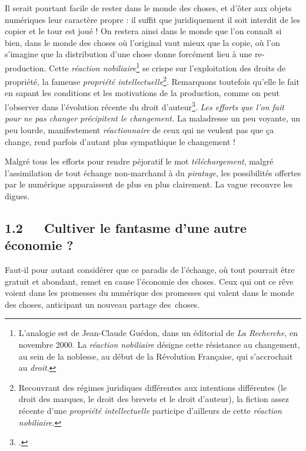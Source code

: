 \documentclass{FramateX}
\begin{document}
\begin{refsection}
Il serait pourtant facile de rester dans le monde des choses, et d'ôter
aux objets numériques leur caractère propre : il suffit que
juridiquement il soit interdit de les copier et le tour est joué ! On
restera ainsi dans le monde que l'on connaît si bien, dans le monde des
choses où l'original vaut mieux que la copie, où l'on s'imagine que la
distribution d'une chose donne forcément lieu à une re-production.
Cette \textit{réaction nobiliaire}\footnote{L'analogie est de
Jean-Claude Guédon, dans un éditorial de \textit{La Recherche}, en
novembre 2000. La \textit{réaction nobiliaire} désigne cette résistance au
changement, au sein de la noblesse, au début de la Révolution
Française, qui s'accrochait au \textit{droit}.} se crispe sur
l'exploitation des droits de propriété, la fameuse \textit{propriété
intellectuelle}\footnote{Recouvrant des régimes juridiques
différentes aux intentions différentes (le droit des marques, le droit
des brevets et le droit d'auteur), la fiction assez récente d'une
\textit{propriété intellectuelle} participe d'ailleurs de cette
\textit{réaction nobiliaire}.}. Remarquons toutefois qu'elle le fait en
sapant les conditions et les motivations de la production, comme on
peut l'observer dans l'évolution récente du droit
d'auteur\footnote{\cite{Macrez2012}.}. \textit{Les efforts que l'on fait
pour ne pas changer précipitent le changement.} La maladresse un peu
voyante, un peu lourde, manifestement \textit{réactionnaire} de ceux
qui ne veulent pas que ça change, rend parfois d'autant plus
sympathique le changement !

Malgré tous les efforts pour rendre péjoratif le mot
\textit{téléchargement}, malgré l'assimilation de tout échange
non-marchand à du \textit{piratage}, les possibilités offertes par le
numérique apparaissent de plus en plus clairement. La vague recouvre
les digues.

\subsection*{1.2~~~Cultiver le fantasme d'une autre économie ?}
{}

Faut-il pour autant considérer que ce paradis de l'échange, où tout
pourrait être gratuit et abondant, remet en cause l'économie des
choses. Ceux qui ont ce rêve voient dans les promesses du numérique des
promesses qui valent dans le monde des choses, anticipant un nouveau
partage des~choses.


\end{refsection}
\end{document}
